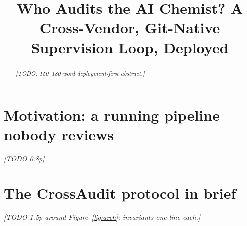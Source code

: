 \documentclass[10pt]{article}
\title{Who Audits the AI Chemist? A Cross-Vendor, Git-Native Supervision Loop, Deployed}
\date{}
\begin{document}
\maketitle

\begin{abstract}
\emph{[TODO: 150--180 word deployment-first abstract.]}
\end{abstract}


\section{Motivation: a running pipeline nobody reviews}
\emph{[TODO 0.8p]}

\section{The CrossAudit protocol in brief}
\emph{[TODO 1.5p around Figure~\ref{fig:arch}; invariants one line each.]}
\end{document}
